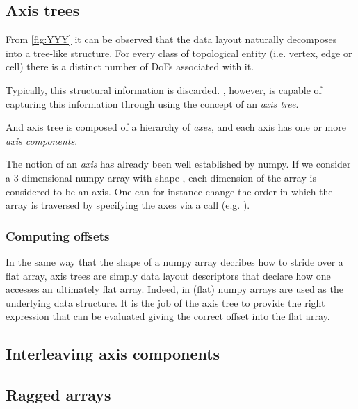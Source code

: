 \documentclass[thesis]{subfiles}
\begin{document}
\subsection{Axis trees}

From \cref{fig:YYY} it can be observed that the data layout naturally decomposes into a tree-like structure.
For every class of topological entity (i.e. vertex, edge or cell) there is a distinct number of DoFs associated with it.

Typically, this structural information is discarded.
, however, is capable of capturing this information through using the concept of an \textit{axis tree}.

And axis tree is composed of a hierarchy of \textit{axes}, and each axis has one or more \textit{axis components}.

The notion of an \textit{axis} has already been well established by numpy.
If we consider a 3-dimensional numpy array with shape , each dimension of the array is considered to be an axis.
One can for instance change the order in which the array is traversed by specifying the axes via a  call (e.g. ).


\subsubsection{Computing offsets}

In the same way that the shape of a numpy array decribes how to stride over a flat array, axis trees are simply data layout descriptors that declare how one accesses an ultimately flat array.
Indeed, in  (flat) numpy arrays are used as the underlying data structure.
It is the job of the axis tree to provide the right expression that can be evaluated giving the correct offset into the flat array.



\subsection{Interleaving axis components}


\subsection{Ragged arrays}
\end{document}
